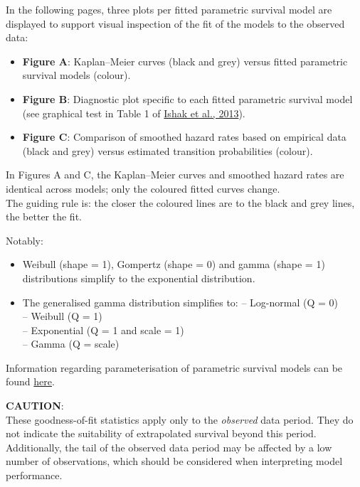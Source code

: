 \documentclass[
]{article}
\providecommand{\tightlist}{%
  \setlength{\itemsep}{0pt}\setlength{\parskip}{0pt}}
\begin{document}
In the following pages, three plots per fitted parametric survival model
are displayed to support visual inspection of the fit of the models to
the observed data:

\begin{itemize}
\tightlist
\item
  \textbf{Figure A}: Kaplan--Meier curves (black and grey) versus fitted
  parametric survival models (colour).\\
\item
  \textbf{Figure B}: Diagnostic plot specific to each fitted parametric
  survival model (see graphical test in Table 1 of
  \href{https://doi.org/10.1007/s40273-013-0064-3}{Ishak et al., 2013}).
\item
  \textbf{Figure C}: Comparison of smoothed hazard rates based on
  empirical data (black and grey) versus estimated transition
  probabilities (colour).
\end{itemize}

In Figures A and C, the Kaplan--Meier curves and smoothed hazard rates
are identical across models; only the coloured fitted curves change.\\
The guiding rule is: the closer the coloured lines are to the black and
grey lines, the better the fit.

Notably:

\begin{itemize}
\tightlist
\item
  Weibull (shape = 1), Gompertz (shape = 0) and gamma (shape = 1)
  distributions simplify to the exponential distribution.\\
\item
  The generalised gamma distribution simplifies to: -- Log-normal (Q =
  0)\\
  -- Weibull (Q = 1)\\
  -- Exponential (Q = 1 and scale = 1)\\
  -- Gamma (Q = scale)
\end{itemize}

Information regarding parameterisation of parametric survival models can
be found
\href{https://devinincerti.com/code/survival-distributions.html}{here}.

\textbf{CAUTION}:\\
These goodness-of-fit statistics apply only to the \emph{observed} data
period. They do not indicate the suitability of extrapolated survival
beyond this period. Additionally, the tail of the observed data period
may be affected by a low number of observations, which should be
considered when interpreting model performance.
\end{document}

